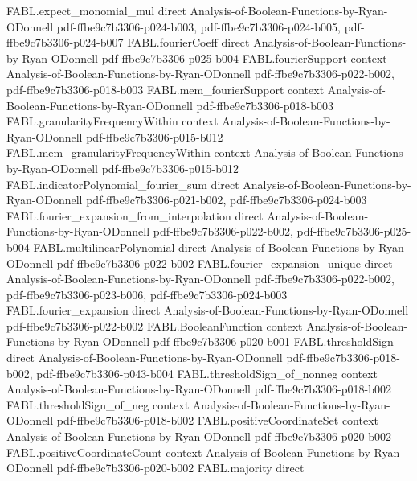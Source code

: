 \begin{theorem}
\proofstep
  {FABL.expect_monomial_mul}
  {direct}
  {Analysis-of-Boolean-Functions-by-Ryan-ODonnell}
  {pdf-ffbe9c7b3306-p024-b003,
    pdf-ffbe9c7b3306-p024-b005,
    pdf-ffbe9c7b3306-p024-b007}
\proofstep
  {FABL.fourierCoeff}
  {direct}
  {Analysis-of-Boolean-Functions-by-Ryan-ODonnell}
  {pdf-ffbe9c7b3306-p025-b004}
\proofstep
  {FABL.fourierSupport}
  {context}
  {Analysis-of-Boolean-Functions-by-Ryan-ODonnell}
  {pdf-ffbe9c7b3306-p022-b002,
    pdf-ffbe9c7b3306-p018-b003}
\proofstep
  {FABL.mem_fourierSupport}
  {context}
  {Analysis-of-Boolean-Functions-by-Ryan-ODonnell}
  {pdf-ffbe9c7b3306-p018-b003}
\proofstep
  {FABL.granularityFrequencyWithin}
  {context}
  {Analysis-of-Boolean-Functions-by-Ryan-ODonnell}
  {pdf-ffbe9c7b3306-p015-b012}
\proofstep
  {FABL.mem_granularityFrequencyWithin}
  {context}
  {Analysis-of-Boolean-Functions-by-Ryan-ODonnell}
  {pdf-ffbe9c7b3306-p015-b012}
\proofstep
  {FABL.indicatorPolynomial_fourier_sum}
  {direct}
  {Analysis-of-Boolean-Functions-by-Ryan-ODonnell}
  {pdf-ffbe9c7b3306-p021-b002,
    pdf-ffbe9c7b3306-p024-b003}
\proofstep
  {FABL.fourier_expansion_from_interpolation}
  {direct}
  {Analysis-of-Boolean-Functions-by-Ryan-ODonnell}
  {pdf-ffbe9c7b3306-p022-b002,
    pdf-ffbe9c7b3306-p025-b004}
\proofstep
  {FABL.multilinearPolynomial}
  {direct}
  {Analysis-of-Boolean-Functions-by-Ryan-ODonnell}
  {pdf-ffbe9c7b3306-p022-b002}
\proofstep
  {FABL.fourier_expansion_unique}
  {direct}
  {Analysis-of-Boolean-Functions-by-Ryan-ODonnell}
  {pdf-ffbe9c7b3306-p022-b002,
    pdf-ffbe9c7b3306-p023-b006,
    pdf-ffbe9c7b3306-p024-b003}
\proofstep
  {FABL.fourier_expansion}
  {direct}
  {Analysis-of-Boolean-Functions-by-Ryan-ODonnell}
  {pdf-ffbe9c7b3306-p022-b002}
\proofstep
  {FABL.BooleanFunction}
  {context}
  {Analysis-of-Boolean-Functions-by-Ryan-ODonnell}
  {pdf-ffbe9c7b3306-p020-b001}
\proofstep
  {FABL.thresholdSign}
  {direct}
  {Analysis-of-Boolean-Functions-by-Ryan-ODonnell}
  {pdf-ffbe9c7b3306-p018-b002,
    pdf-ffbe9c7b3306-p043-b004}
\proofstep
  {FABL.thresholdSign_of_nonneg}
  {context}
  {Analysis-of-Boolean-Functions-by-Ryan-ODonnell}
  {pdf-ffbe9c7b3306-p018-b002}
\proofstep
  {FABL.thresholdSign_of_neg}
  {context}
  {Analysis-of-Boolean-Functions-by-Ryan-ODonnell}
  {pdf-ffbe9c7b3306-p018-b002}
\proofstep
  {FABL.positiveCoordinateSet}
  {context}
  {Analysis-of-Boolean-Functions-by-Ryan-ODonnell}
  {pdf-ffbe9c7b3306-p020-b002}
\proofstep
  {FABL.positiveCoordinateCount}
  {context}
  {Analysis-of-Boolean-Functions-by-Ryan-ODonnell}
  {pdf-ffbe9c7b3306-p020-b002}
\proofstep
  {FABL.majority}
  {direct}

\end{theorem}
